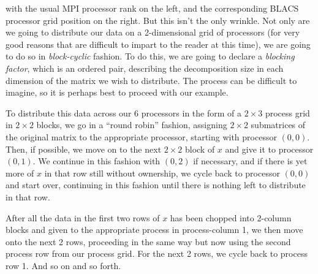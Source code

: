 with the usual MPI processor rank on the left, and the corresponding BLACS~ processor grid position on the right.  But this isn't the only wrinkle.  Not only are we going to distribute our data on a 2-dimensional grid of processors (for very good reasons that are difficult to impart to the reader at this time), we are going to do so in \emph{block-cyclic} fashion.  To do this, we are going to declare a \emph{blocking factor}, which is an ordered pair, describing the decomposition size in each dimension of the matrix we wish to distribute.  The process can be difficult to imagine, so it is perhaps best to proceed with our example.

To distribute this data across our 6 processors in the form of a $2\times 3$ process grid in $2\times 2$ blocks, we go in a ``round robin'' fashion, assigning $2\times 2$ submatrices of the original matrix to the appropriate processor, starting with processor $(0, 0)$.  Then, if possible, we move on to the next $2\times 2$ block of $x$ and give it to processor $(0, 1)$.  We continue in this fashion with $(0,2)$ if necessary, and if there is yet more of $x$ in that row still without ownership, we cycle back to processor $(0,0)$ and start over, continuing in this fashion until there is nothing left to distribute in that row.

After all the data in the first two rows of $x$ has been chopped into 2-column blocks and given to the appropriate process in process-column 1, we then move onto the next 2 rows, proceeding in the same way but now using the second process row from our process grid.  For the next 2 rows, we cycle back to process row 1.  And so on and so forth.

